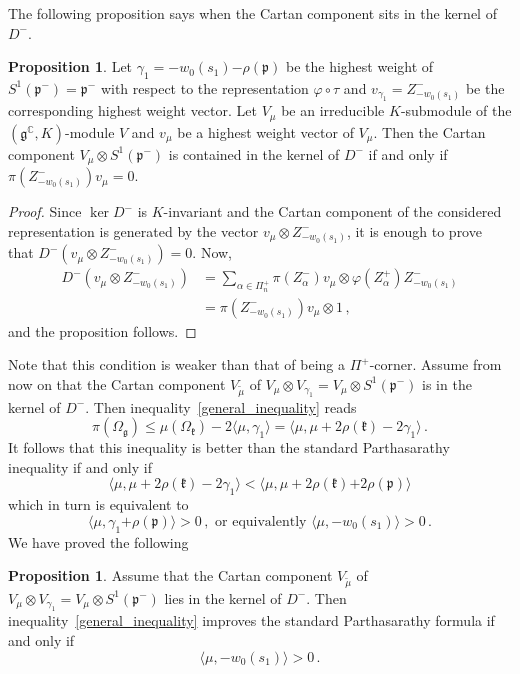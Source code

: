\documentclass{amsart}[draft,11pt]
\newcommand{\fg}{{\mathfrak{g}}}
\newcommand{\fk}{{\mathfrak{k}}}
\newcommand{\fp}{{\mathfrak{p}}}
\numberwithin{equation}{section}
\theoremstyle{definition}
\newtheorem{proposition}[theorem]{Proposition}
\begin{document}
The following proposition says when the Cartan component sits in the kernel of $D^-$.
\begin{proposition}
\label{cartan}
Let $\gamma_1=-w_0(s_1){-\rho(\fp)}$ be the highest weight
of $S^1(\fp^-)=\fp^-$ with respect to the representation
$\varphi \circ \tau$ and $v_{\gamma_1}=Z_{-w_0(s_1)}^-$ be the corresponding highest weight vector. Let $V_\mu$ be an irreducible $K$-submodule of the $(\fg^\mathbb{C},K)$-module $V$ and $v_\mu$ be a highest weight vector of $V_\mu$. Then the Cartan component $V_\mu \otimes S^1(\fp^-)$ is contained in the kernel of $D^-$ if and only if
$\pi(Z_{-w_0(s_1)}^-)v_\mu=0$.
\end{proposition}
\begin{proof}
Since $\ker D^-$ is $K$-invariant and the Cartan component of the considered representation is generated by the vector $v_\mu \otimes Z_{-w_0(s_1)}^-$, it is enough to prove that $D^-(v_\mu \otimes Z_{-w_0(s_1)}^-)=0$. Now,
\begin{align*}
    D^-(v_\mu \otimes Z_{-w_0(s_1)}^-)
    &=\sum_{\alpha\in\Pi^+_n}
        \pi(Z_\alpha^-)v_\mu\otimes \varphi(Z_\alpha^+)Z_{-w_0(s_1)}^- \\
    &=\pi(Z_{-w_0(s_1)}^-)v_\mu\otimes 1\,,
\end{align*}
and the proposition follows.
\end{proof}
Note that this condition is weaker than that of being a $\Pi^+$-corner. Assume from now on that the Cartan component $V_{\tilde{\mu}}$ of $V_\mu\otimes V_{\gamma_1}=V_\mu \otimes S^1(\fp^-)$ is in the kernel of $D^-$.
Then inequality~\eqref{general_inequality} reads
$$ 
\pi(\Omega_\fg)\leq \mu(\Omega_\fk)-2\langle \mu,\gamma_1 \rangle = \langle \mu,\mu+2\rho(\fk)-2\gamma_1 \rangle \,.
$$
It follows that this inequality is better than the standard Parthasarathy inequality if and only if 
$$
\langle \mu,\mu+2\rho(\fk)-2\gamma_1 \rangle 
< \langle \mu,\mu+2\rho(\fk){+2\rho(\fp)} \rangle 
$$
which in turn is equivalent to
$$
\langle \mu,\gamma_1 {+\rho(\fp)}  \rangle > 0 \,,
\text{ or equivalently }
\langle \mu,-w_0(s_1) \rangle > 0 \,.
$$
We have proved the following
\begin{proposition}
\label{cartanineq}
Assume that the Cartan component $V_{\tilde{\mu}}$ of $V_\mu\otimes V_{\gamma_1}=V_\mu \otimes S^1(\fp^-)$ lies in the kernel of $D^-$. Then inequality~\eqref{general_inequality} improves the standard
Parthasarathy formula if and only if
$$ \langle \mu,-w_0(s_1) \rangle > 0 \,.$$
\end{proposition}
\end{document}
